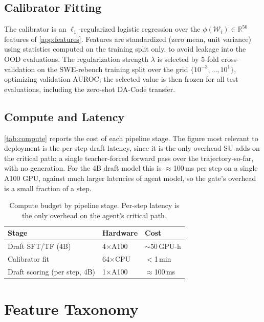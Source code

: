 \documentclass[11pt]{article}
\newcommand{\Hnumber}[1]{#1}
\begin{document}
\subsection{Calibrator Fitting}
The calibrator is an $\ell_1$-regularized logistic regression over the
$\phi(\mathcal{W}_i)\in\mathbb{R}^{50}$ features of \autoref{app:features}. Features are standardized
(zero mean, unit variance) using statistics computed on the training split only, to avoid leakage
into the OOD evaluations. The regularization strength $\lambda$ is selected by 5-fold
cross-validation on the SWE-rebench training split over the grid \Hnumber{$\{10^{-3},\dots,10^{1}\}$},
optimizing validation AUROC; the selected value is then frozen for all test
evaluations, including the zero-shot DA-Code transfer.

\subsection{Compute and Latency}
\autoref{tab:compute} reports the cost of each pipeline stage. The figure most relevant to
deployment is the per-step draft latency, since it is the only overhead SU adds on the critical
path: a single teacher-forced forward pass over the trajectory-so-far, with no generation. For the \Hnumber{4B} draft model this is \Hnumber{$\approx$100}\,ms per step on a single A100 GPU, against much larger latencies of agent model, so the gate's overhead is a small fraction of a step.

\begin{table}[h]
\centering
\caption{Compute budget by pipeline stage. Per-step latency is the only overhead on the agent's
critical path.}
\label{tab:compute}
\small
\setlength{\tabcolsep}{4pt}
\begin{tabular}{@{}lll@{}}
\toprule
\textbf{Stage} & \textbf{Hardware} & \textbf{Cost} \\
\midrule
Draft SFT/TF (4B)   & \Hnumber{4$\times$A100} & \Hnumber{$\sim$50}\,GPU-h \\
Calibrator fit      & \Hnumber{64$\times$CPU}  & \Hnumber{$<$1}\,min \\
Draft scoring (per step, 4B) & \Hnumber{1$\times$A100} & \Hnumber{$\approx$100}\,ms \\
\bottomrule
\end{tabular}
\end{table}

\section{Feature Taxonomy}
\label{app:features}
\end{document}
